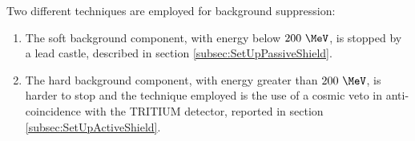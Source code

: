 Two different techniques are employed for background suppression:

\begin{enumerate}

\item{}  The soft background component, with energy below $200~\MeV$, is stopped by a lead castle, described in section \ref{subsec:SetUpPassiveShield}.

\item{} The hard background component, with energy greater than $200~\MeV$, is harder to stop and the technique employed is the use of a cosmic veto in anti-coincidence with the TRITIUM detector, reported in section \ref{subsec:SetUpActiveShield}. %

\end{enumerate}